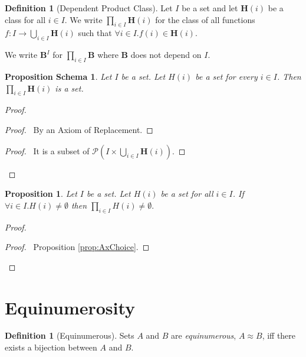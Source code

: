 \documentclass{book}
\let\qed\relax
\newtheorem{prop}[ax]{Proposition}
\newtheorem{props}[ax]{Proposition Schema}
\theoremstyle{definition}
\newtheorem{df}[ax]{Definition}
\begin{document}
\begin{df}[Dependent Product Class]
Let $I$ be a set and let $\mathbf{H}(i)$ be a class for all $i \in I$. We write $\prod_{i \in I} \mathbf{H}(i)$ for the class of all functions $f : I \rightarrow \bigcup_{i \in I} \mathbf{H}(i)$ such that $\forall i \in I. f(i) \in \mathbf{H}(i)$.

We write $\mathbf{B}^I$ for $\prod_{i \in I} \mathbf{B}$ where $\mathbf{B}$ does not depend on $I$.
\end{df}

\begin{props}
Let $I$ be a set. Let $H(i)$ be a set for every $i \in I$. Then $\prod_{i \in I} \mathbf{H}(i)$ is a set.
\end{props}

\begin{proof}
\pf
{}
\begin{proof}
	\pf\ By an Axiom of Replacement.
\end{proof}
\begin{proof}
	\pf\ It is a subset of $\mathcal{P}\left( I \times \bigcup_{i \in I} \mathbf{H}(i) \right)$.
\end{proof}
\qed
\end{proof}

\begin{prop}
Let $I$ be a set. Let $H(i)$ be a set for all $i \in I$. If $\forall i \in I. H(i) \neq \emptyset$ then $\prod_{i \in I} H(i) \neq \emptyset.$
\end{prop}

\begin{proof}
\pf
{}
\begin{proof}
	\pf\ Proposition \ref{prop:AxChoice}.
\end{proof}
\qed
\end{proof}

\section{Equinumerosity}

\begin{df}[Equinumerous]
Sets $A$ and $B$ are \emph{equinumerous}, $A \approx B$, iff there exists a bijection between $A$ and $B$.
\end{df}
\end{document}
